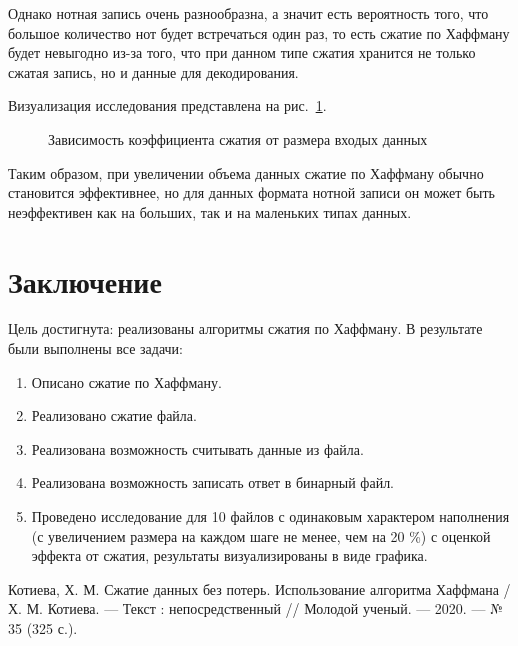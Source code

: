\documentclass[12pt, a4paper]{article}
\begin{document}
Однако нотная запись очень разнообразна, а значит есть вероятность того, 
что большое количество нот будет встречаться один раз, то есть сжатие по 
Хаффману будет невыгодно из-за того, что при данном типе сжатия хранится не
только сжатая запись, но и данные для декодирования. 

Визуализация исследования представлена на рис.~\ref{img:grap11}.
\begin{figure}[h]
  		\caption{Зависимость коэффициента сжатия от размера входых данных}
  		\label{img:grap11}
	\end{figure}

Таким образом, при увеличении объема данных сжатие по Хаффману обычно становится 
эффективнее, но для данных формата нотной записи он может быть
неэффективен как на больших, так и на маленьких типах данных.
\newpage
\section*{Заключение}
Цель достигнута: реализованы алгоритмы сжатия по Хаффману. В результате 
были выполнены все задачи:
\begin{enumerate}
\item Описано сжатие по Хаффману.
\item Реализовано сжатие файла.
\item Реализована возможность считывать данные из 
файла.
\item Реализована возможность записать ответ в 
бинарный файл.
\item Проведено исследование для 10 файлов с одинаковым характером 
наполнения (с увеличением размера на каждом шаге не менее, чем на 20 \%) с 
оценкой эффекта от сжатия, результаты визуализированы в виде графика.
\end{enumerate}
\newpage
\begin{center}
\begin{thebibliography}{}
 Котиева, Х. М. Сжатие данных без потерь. Использование алгоритма Хаффмана / Х. М. Котиева. — Текст : непосредственный // Молодой ученый. — 2020. — № 35 (325 с.).
\end{thebibliography}
\end{center}
\end{document}
